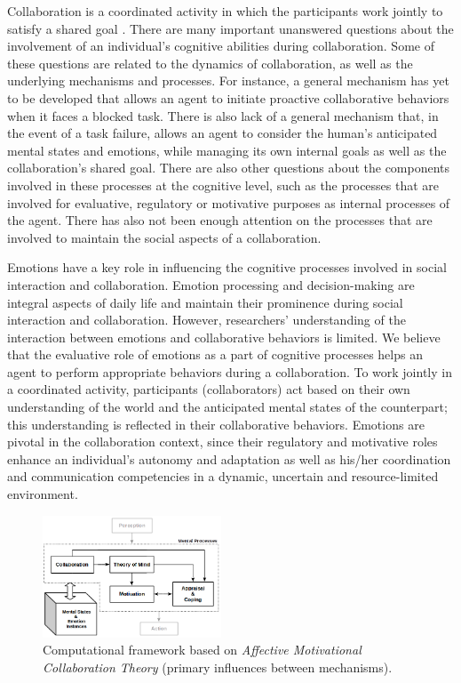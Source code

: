 \documentclass[letterpaper]{article}
\begin{document}
Collaboration is a coordinated activity in which the participants work jointly
to satisfy a shared goal \cite{grosz:plans-discourse}. There are many important
unanswered questions about the involvement of an individual's cognitive
abilities during collaboration. Some of these questions are related to the
dynamics of collaboration, as well as the underlying mechanisms and processes.
For instance, a general mechanism has yet to be developed that allows an agent
to initiate proactive collaborative behaviors when it faces a blocked task.
There is also lack of a general mechanism that, in the event of a task failure,
allows an agent to consider the human's anticipated mental states and emotions,
while managing its own internal goals as well as the collaboration's shared
goal. There are also other questions about the components involved in these
processes at the cognitive level, such as the processes that are involved for
evaluative, regulatory or motivative purposes as internal processes of the
agent. There has also not been enough attention on the processes that are
involved to maintain the social aspects of a collaboration.

Emotions have a key role in influencing the cognitive processes involved in
social interaction and collaboration. Emotion processing and decision-making are
integral aspects of daily life and maintain their prominence during social
interaction and collaboration. However, researchers' understanding of the
interaction between emotions and collaborative behaviors is limited. We believe
that the evaluative role of emotions as a part of cognitive processes helps an
agent to perform appropriate behaviors during a collaboration. To work jointly
in a coordinated activity, participants (collaborators) act based on their own
understanding of the world and the anticipated mental states of the counterpart;
this understanding is reflected in their collaborative behaviors. Emotions are
pivotal in the collaboration context, since their regulatory and motivative
roles enhance an individual's autonomy and adaptation as well as his/her
coordination and communication competencies in a dynamic, uncertain and
resource-limited environment.

\begin{figure}[tbh]
  \centering
  \includegraphics[width=0.474\textwidth]{figure/theory-general.png}
  \caption{Computational framework based on \textit{Affective Motivational
  Collaboration Theory} (primary influences between mechanisms).}
  \label{fig:cpm}
\end{figure}
\end{document}
